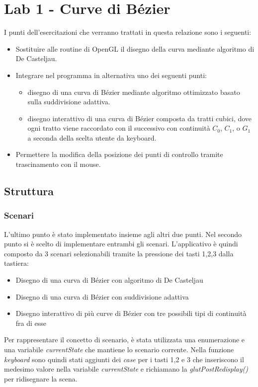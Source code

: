 \chapter*{Lab 1 - Curve di Bézier}

I punti dell'esercitazioni che verranno trattati in questa relazione sono i seguenti:
	
\begin{itemize}
  \item Sostituire alle routine di OpenGL il disegno della curva mediante algoritmo di De Casteljau.
  \item Integrare nel programma in alternativa uno dei seguenti punti:
 	\begin{itemize}
  		\item disegno di una curva di Bézier mediante algoritmo ottimizzato basato sulla suddivisione adattiva.
  		\item disegno interattivo di una curva di Bézier composta da tratti cubici, dove ogni tratto viene raccordato con il successivo con continuità $C_0$, $C_1$, o $G_1$ a seconda della scelta utente da keyboard.
		\end{itemize}
	\item Permettere la modifica della posizione dei punti di controllo tramite trascinamento con il mouse.
\end{itemize}

\section{Struttura}
\subsection{Scenari}
L'ultimo punto è stato implementato insieme agli altri due punti.
Nel secondo punto si è scelto di implementare entrambi gli scenari. L'applicativo è quindi composto da 3 scenari selezionabili tramite la pressione dei tasti 1,2,3 dalla tastiera: 
\begin{itemize}
  \item Disegno di una curva di Bézier con algoritmo di De Casteljau
  \item Disegno di una curva di Bézier con suddivisione adattiva
  \item Disegno interattivo di più curve di Bézier con tre possibili tipi di continuità fra di esse
\end{itemize}

Per rappresentare il concetto di scenario, è stata utilizzata una enumerazione e una variabile \emph{currentState} che mantiene lo scenario corrente. 
Nella funzione \emph{keyboard} sono quindi stati aggiunti dei \textit{case} per i tasti 1,2 e 3 che inseriscono il medesimo valore nella variabile \textit{currentState} e richiamano la \textit{glutPostRedisplay()} per ridisegnare la scena.

